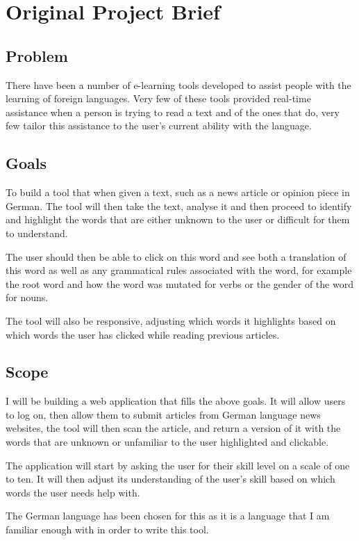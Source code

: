 \chapter{Original Project Brief}

\section{Problem}

There have been a number of e-learning tools developed to assist people with the learning of foreign languages. Very few of these tools provided real-time assistance when a person is trying to read a text and of the ones that do, very few tailor this assistance to the user's current ability with the language.

\section{Goals}

To build a tool that when given a text, such as a news article or opinion piece in German. The tool will then take the text, analyse it and then proceed to identify and highlight the words that are either unknown to the user or difficult for them to understand.

The user should then be able to click on this word and see both a translation of this word as well as any grammatical rules associated with the word, for example the root word and how the word was mutated for verbs or the gender of the word for nouns.

The tool will also be responsive, adjusting which words it highlights based on which words the user has clicked while reading previous articles.

\section{Scope}

I will be building a web application that fills the above goals. It will allow users to log on, then allow them to submit articles from German language news websites, the tool will then scan the article, and return a version of it with the words that are unknown or unfamiliar to the user highlighted and clickable.

The application will start by asking the user for their skill level on a scale of one to ten. It will then adjust  its understanding of the user's skill based on which words the user needs help with.

The German language has been chosen for this as it is a language that I am familiar enough with in order to write this tool.

